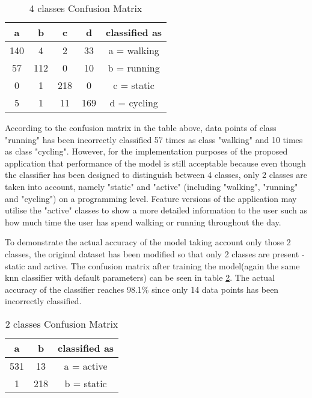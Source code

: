    \begin{table}[ht]
    \centering
    \begin{tabular}{ |c|c|c|c||c| } 
     \hline
     a & b & c & d & classified as\\
     \hline \hline
     140 & 4 & 2 & 33 & a = walking \\
     57 & 112& 0 & 10 & b = running \\
     0 & 1 & 218 & 0 & c = static \\
     5 & 1 & 11 & 169 & d = cycling \\
     \hline
    \end{tabular}
    \caption{4 classes Confusion Matrix}
    \label{table:4_class_confusion_matrix}
    \end{table}

According to the confusion matrix in the table above, data points of class "running" has been incorrectly classified 57 times as class "walking" and 10 times as class "cycling". However, for the implementation purposes of the proposed application that performance of the model is still acceptable because even though the classifier has been designed to distinguish between 4 classes, only 2 classes are taken into account, namely "static" and "active" (including "walking", "running" and "cycling") on a programming level. Feature versions of the application may utilise the "active" classes to show a more detailed information to the user such as how much time the user has spend walking or running throughout the day.

To demonstrate the actual accuracy of the model taking account only those 2 classes, the original dataset has been modified so that only 2 classes are present - static and active. The confusion matrix after training the model(again the same \gls{knn} classifier with default parameters) can be seen in table \ref{table:2_class_confusion_matrix}. The actual accuracy of the classifier reaches 98.1\% since only 14 data points has been incorrectly classified.

    \begin{table}[ht]
    \centering
    \begin{tabular}{ |c|c|c| } 
     \hline
     a & b & classified as\\
     \hline \hline
      531 & 13 & a = active\\
      1 & 218 & b = static\\
     \hline
    \end{tabular}
    \caption{2 classes Confusion Matrix}
    \label{table:2_class_confusion_matrix}
    \end{table}
    
